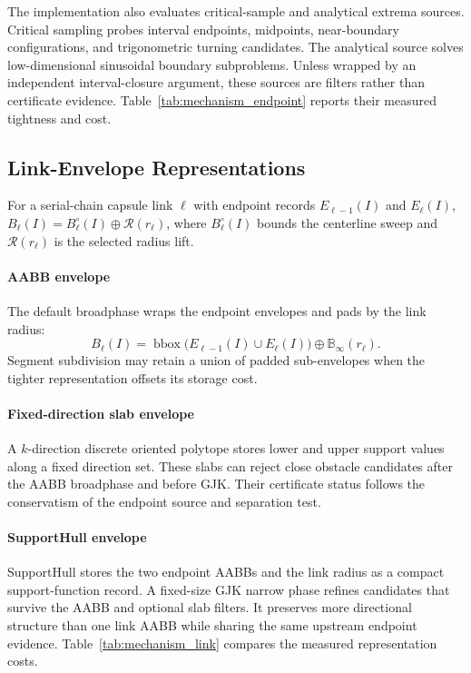\documentclass[journal]{IEEEtran}
\newcommand{\Ball}{\ensuremath{\mathbb{B}}}
\begin{document}
The implementation also evaluates critical-sample and analytical extrema
sources. Critical sampling probes interval endpoints, midpoints, near-boundary
configurations, and trigonometric turning candidates. The analytical source
solves low-dimensional sinusoidal boundary subproblems. Unless wrapped by an
independent interval-closure argument, these sources are filters rather than
certificate evidence. Table~\ref{tab:mechanism_endpoint} reports their measured
tightness and cost.

\subsection{Link-Envelope Representations}\label{sec:rewrite_link_env}

For a serial-chain capsule link $\ell$ with endpoint records
$E_{\ell-1}(I)$ and $E_\ell(I)$,
$B_\ell(I)=B_\ell^\circ(I)\oplus\mathcal{R}(r_\ell)$, where
$B_\ell^\circ(I)$ bounds the centerline sweep and $\mathcal{R}(r_\ell)$ is the
selected radius lift.

\paragraph{AABB envelope}
The default broadphase wraps the endpoint envelopes and pads by the link radius:
\[
B_\ell(I)=\operatorname{bbox}\bigl(E_{\ell-1}(I)\cup E_\ell(I)\bigr)
\oplus\Ball_\infty(r_\ell).
\]
Segment subdivision may retain a union of padded sub-envelopes when the tighter
representation offsets its storage cost.

\paragraph{Fixed-direction slab envelope}
A $k$-direction discrete oriented polytope stores lower and upper support values
along a fixed direction set. These slabs can reject close obstacle candidates
after the AABB broadphase and before GJK. Their certificate status follows the
conservatism of the endpoint source and separation test.

\paragraph{SupportHull envelope}
SupportHull stores the two endpoint AABBs and the link radius as a compact
support-function record. A fixed-size GJK narrow phase refines candidates that
survive the AABB and optional slab filters. It preserves more directional
structure than one link AABB while sharing the same upstream endpoint evidence.
Table~\ref{tab:mechanism_link} compares the measured representation costs.
\end{document}
